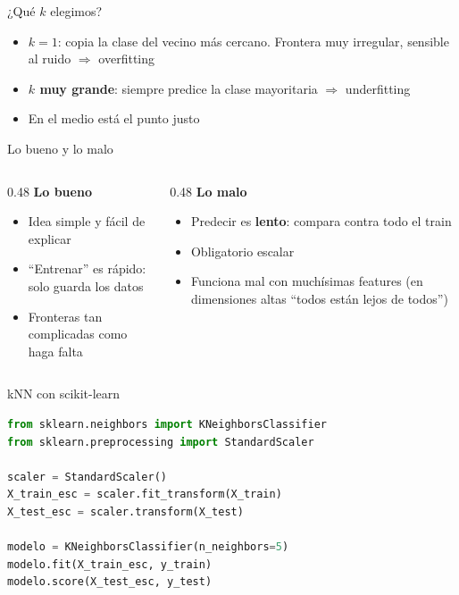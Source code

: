 \begin{frame}{¿Qué $k$ elegimos?}
  \begin{itemize}
    \item \textbf{$k = 1$}: copia la clase del vecino más cercano. Frontera
      muy irregular, sensible al ruido $\Rightarrow$ overfitting
    \item \textbf{$k$ muy grande}: siempre
      predice la clase mayoritaria $\Rightarrow$ underfitting
    \item En el medio está el punto justo
  \end{itemize}
  \pause
\end{frame}

\begin{frame}{Lo bueno y lo malo}
  \begin{columns}[T]
    \begin{column}{0.48\textwidth}
      \textbf{Lo bueno}
      \begin{itemize}
        \item Idea simple y fácil de explicar
        \item ``Entrenar'' es rápido: solo guarda los datos
        \item Fronteras tan complicadas como haga falta
      \end{itemize}
    \end{column}
    \begin{column}{0.48\textwidth}
      \textbf{Lo malo}
      \begin{itemize}
        \item Predecir es \textbf{lento}: compara contra todo el train
        \item Obligatorio escalar
        \item Funciona mal con muchísimas features (en dimensiones altas
          ``todos están lejos de todos'')
      \end{itemize}
    \end{column}
  \end{columns}
  \vspace{0.5em}
\end{frame}

\begin{frame}[fragile]{kNN con scikit-learn}
  \begin{lstlisting}[language=Python]
from sklearn.neighbors import KNeighborsClassifier
from sklearn.preprocessing import StandardScaler

scaler = StandardScaler()
X_train_esc = scaler.fit_transform(X_train)
X_test_esc = scaler.transform(X_test)

modelo = KNeighborsClassifier(n_neighbors=5)
modelo.fit(X_train_esc, y_train)
modelo.score(X_test_esc, y_test)
  \end{lstlisting}
\end{frame}

